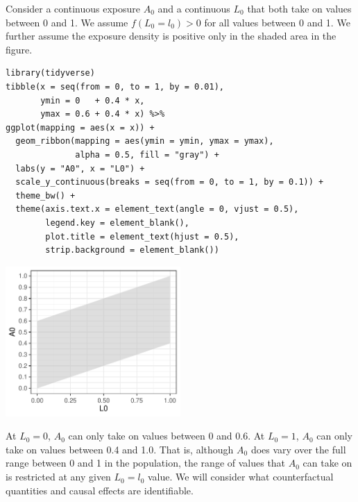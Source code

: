 \documentclass[dvipdfmx,10pt]{article}
\begin{document}
Consider a continuous exposure \(A_{0}\) and a continuous \(L_{0}\) that both take on values between 0 and 1. We assume \(f(L_{0} = l_{0}) > 0\) for all values between 0 and 1. We further assume the exposure density is positive only in the shaded area in the figure.

\scriptsize
\begin{verbatim}
library(tidyverse)
tibble(x = seq(from = 0, to = 1, by = 0.01),
       ymin = 0   + 0.4 * x,
       ymax = 0.6 + 0.4 * x) %>%
ggplot(mapping = aes(x = x)) +
  geom_ribbon(mapping = aes(ymin = ymin, ymax = ymax),
              alpha = 0.5, fill = "gray") +
  labs(y = "A0", x = "L0") +
  scale_y_continuous(breaks = seq(from = 0, to = 1, by = 0.1)) +
  theme_bw() +
  theme(axis.text.x = element_text(angle = 0, vjust = 0.5),
        legend.key = element_blank(),
        plot.title = element_text(hjust = 0.5),
        strip.background = element_blank())
\end{verbatim}

\begin{center}
\includegraphics[page=1,keepaspectratio,width=0.5\textwidth,height=\textheight]{./source/positivity_figure1.pdf}
\end{center}
\normalsize

At \(L_{0} = 0\), \(A_{0}\) can only take on values between 0 and 0.6. At \(L_{0} = 1\), \(A_{0}\) can only take on values between 0.4 and 1.0. That is, although \(A_{0}\) does vary over the full range between 0 and 1 in the population, the range of values that \(A_{0}\) can take on is restricted at any given \(L_{0}=l_{0}\) value. We will consider what counterfactual quantities and causal effects are identifiable.\\
\end{document}

